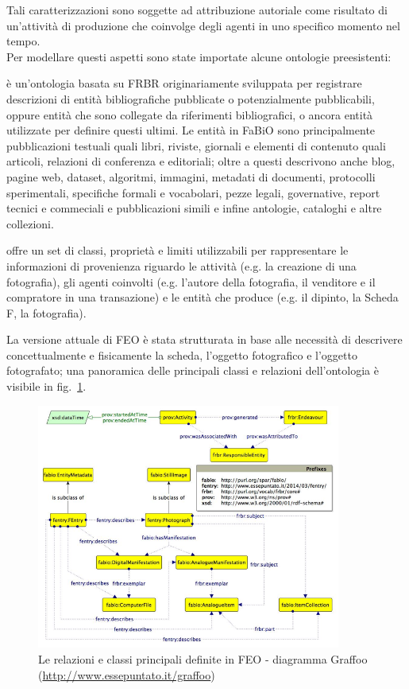 Tali caratterizzazioni sono soggette ad attribuzione autoriale come risultato di un'attività di produzione che coinvolge degli agenti in uno specifico momento nel tempo.\\
Per modellare questi aspetti sono state importate alcune ontologie preesistenti:
\begin{description}\label{sec:imported-ontologies}
\item[FaBiO - FRBR-aligned Bibliographic Ontology] \cite{6} è un'ontologia basata su FRBR originariamente sviluppata per registrare descrizioni di entità bibliografiche pubblicate o potenzialmente pubblicabili, oppure entità che sono collegate da riferimenti bibliografici, o ancora entità utilizzate per definire questi ultimi. Le entità in FaBiO sono principalmente pubblicazioni testuali quali libri, riviste, giornali e elementi di contenuto quali articoli, relazioni di conferenza e editoriali; oltre a questi descrivono anche blog, pagine web, dataset, algoritmi, immagini, metadati di documenti, protocolli sperimentali, specifiche formali e vocabolari, pezze legali, governative, report tecnici e commeciali e pubblicazioni simili e infine antologie, cataloghi e altre collezioni.
\item[PROV-O - Provenance Ontology] \cite{18} offre un set di classi, proprietà e limiti utilizzabili per rappresentare le informazioni di provenienza riguardo le attività (e.g. la creazione di una fotografia), gli agenti coinvolti (e.g. l'autore della fotografia, il venditore e il compratore in una transazione) e le entità che produce (e.g. il dipinto, la Scheda F, la fotografia).
\end{description}

La versione attuale di FEO è stata strutturata in base alle necessità di descrivere concettualmente e fisicamente la scheda, l'oggetto fotografico e l'oggetto fotografato; una panoramica delle principali classi e relazioni dell'ontologia è visibile in fig.~\ref{fig:feo-mainclasses}.

\begin{figure}
    \centering
    \includegraphics[width=100mm]{images/feo-mainclasses.png}
	\caption{Le relazioni e classi principali definite in FEO - diagramma Graffoo (\protect\url{http://www.essepuntato.it/graffoo})}
	\label{fig:feo-mainclasses}
\end{figure}

